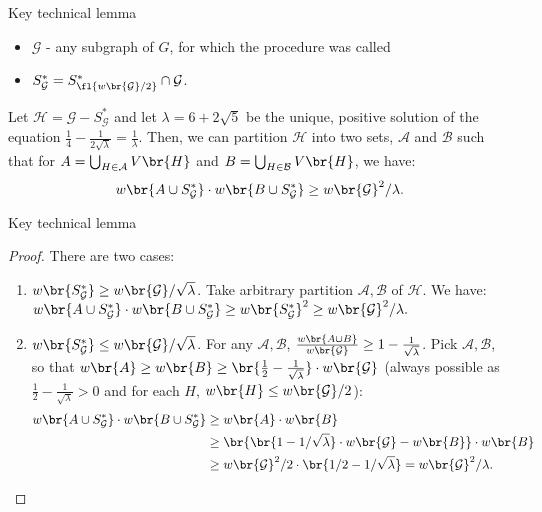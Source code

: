 \begin{frame}{Key technical lemma}

    \begin{itemize}
        \item $\mathcal{G}$ - any subgraph of $G$, for which the procedure was called
        \pause
        \item $S_{\mathcal{G}}^*=S_{\fl{w\br{\mathcal{G}}/2}}^*\cap \mathcal{G}$.
    \end{itemize}
    \pause
    \begin{lemma}\label{lambda_lemma}
        Let $\mathcal{H}=\mathcal{G}-S_{\mathcal{G}}^*$ and let $\lambda=6+2\sqrt{5}$ be the unique, positive solution of the equation $\frac{1}{4}-\frac{1}{2\sqrt{\lambda}}=\frac{1}{\lambda}$. Then, we can partition $\mathcal{H}$ into two sets, $\mathcal{A}$ and $\mathcal{B}$ such that for $A=\bigcup_{H\in\mathcal{A}}V\br{H}$ and $B=\bigcup_{H\in\mathcal{B}}V\br{H}$, we have:
        $$w\br{A\cup S_{\mathcal{G}}^*}\cdot w\br{B\cup S_{\mathcal{G}}^*}\geq w\br{\mathcal{G}}^2/\lambda.$$
    \end{lemma}

\end{frame}

\begin{frame}{Key technical lemma}
\begin{proof}
                There are two cases:
                \begin{enumerate}
                    \item $w\br{ S_{\mathcal{G}}^*}\geq w\br{\mathcal{G}}/\sqrt{\lambda}$. Take arbitrary partition $\mathcal{A}, \mathcal{B}$ of $\mathcal{H}$. We have:
                    $w\br{A\cup S_{\mathcal{G}}^*}\cdot w\br{B\cup S_{\mathcal{G}}^*}\geq w\br{ S_{\mathcal{G}}^*}^2 \geq w\br{\mathcal{G}}^2/\lambda.$
                \pause
                \item $w\br{ S_{\mathcal{G}}^*} \leq w\br{\mathcal{G}}/\sqrt{\lambda}$.
                For any $\mathcal{A},\mathcal{B}$, $\frac{w\br{A\cup B}}{w\br{\mathcal{G}}}\geq 1-\frac{1}{\sqrt{\lambda}}$. Pick $\mathcal{A},\mathcal{B}$, so that $w\br{A}\geq w\br{B}\geq \br{\frac{1}{2}-\frac{1}{\sqrt{\lambda}}}\cdot w\br{\mathcal{G}}$ (always possible as $\frac{1}{2}-\frac{1}{\sqrt{\lambda}}>0$ and for each $H$, $w\br{H}\leq w\br{\mathcal{G}}/2$):
                \pause
                \begin{align*}
                w\br{A\cup S_{\mathcal{G}}^*}\cdot w\br{B\cup S_{\mathcal{G}}^*}&\geq w\br{A}\cdot w\br{B} \\&\geq \br{\br{1-{1}/{\sqrt{\lambda}}}\cdot w\br{\mathcal{G}}-w\br{B}}\cdot w\br{B}\\&\geq  {w\br{\mathcal{G}}^2}/{2}\cdot \br{{1}/{2}-{1}/{\sqrt{\lambda}}} = {w\br{\mathcal{G}}^2}/{\lambda}.   
                \end{align*}
            
                \end{enumerate}
            \end{proof}
\end{frame}

